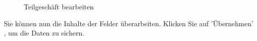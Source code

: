 \begin{figure}[H]
\caption{Teilgeschäft bearbeiten}
\end{figure}

Sie können nun die Inhalte der Felder überarbeiten. Klicken Sie auf 'Übernehmen' , um die Daten zu sichern.

